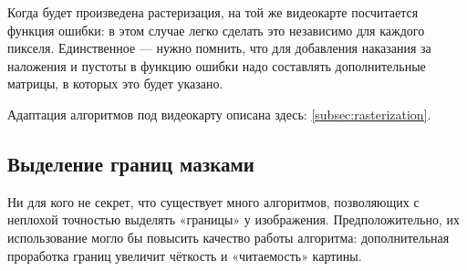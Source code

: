 Когда будет произведена растеризация, на той же видеокарте посчитается функция ошибки: в этом случае легко сделать это независимо для каждого пикселя.
Единственное — нужно помнить, что для добавления наказания за наложения и пустоты в функцию ошибки надо составлять дополнительные матрицы, в которых это будет указано.


Адаптация алгоритмов под видеокарту описана здесь: \ref{subsec:rasterization}.

\subsection{Выделение границ мазками}
Ни для кого не секрет, что существует много алгоритмов, позволяющих с неплохой точностью выделять «границы» у изображения.
Предположительно, их использование могло бы повысить качество работы алгоритма: дополнительная проработка границ увеличит чёткость
и «читаемость» картины.

